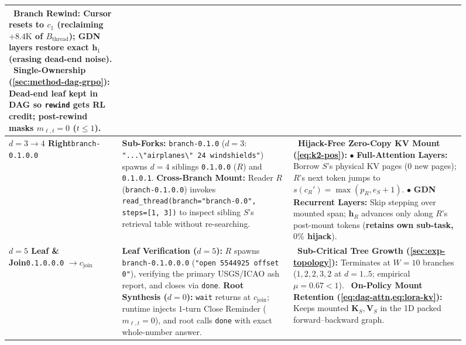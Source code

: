\documentclass{article}
\newcommand{\tstrut}{\rule{0pt}{3.55ex}}
\newcommand{\bstrut}{\rule[-2.15ex]{0pt}{0pt}}
\newcommand{\good}[1]{{\color{ourstext}\bfseries #1}}
\newcommand{\cmarkyes}{\textcolor{ourstext}{\ding{51}}}
\begin{document}
\begin{figure}[!t]
{\begin{tabular}{L{2.45cm} L{8.15cm} L{7.90cm}}
\tstrut\cmarkyes~\textbf{Branch Rewind:} Cursor resets to $c_1$ (reclaiming $+8.4\text{K}$ of $B_{\text{thread}}$); GDN layers restore exact $\mathbf{h}_1$ (erasing dead-end noise).\newline
\cmarkyes~\textbf{Single-Ownership (\cref{sec:method-dag-grpo}):} Dead-end leaf kept in DAG so \texttt{rewind} gets RL credit; post-rewind masks $m_{\ell,t}=0$ ($t \le 1$).\bstrut \\
\midrule
{}
\tstrut\textbf{$d=3 \to 4$ Right}\newline\texttt{branch-0.1.0.0}\bstrut &
\tstrut\textbf{Sub-Forks:} \texttt{branch-0.1.0} ($d=3$: \texttt{"...\textbackslash"airplanes\textbackslash" 24 windshields"}) spawns $d=4$ siblings \texttt{0.1.0.0} ($R$) and \texttt{0.1.0.1}.\newline
\textbf{Cross-Branch Mount:} Reader $R$ (\texttt{branch-0.1.0.0}) invokes \texttt{read\_thread(branch="branch-0.0", steps=[1, 3])} to inspect sibling $S$'s retrieval table without re-searching.\bstrut &
\tstrut\good{\cmarkyes~Hijack-Free Zero-Copy KV Mount (\cref{eq:k2-pos}):}\newline
$\bullet$ \textbf{Full-Attention Layers:} Borrow $S$'s physical KV pages ($0$ new pages); $R$'s next token jumps to $s(c_R') = \max(p_R, e_S+1)$.\newline
$\bullet$ \textbf{GDN Recurrent Layers:} Skip stepping over mounted span; $\mathbf{h}_R$ advances only along $R$'s post-mount tokens (\textbf{retains own sub-task, $0\%$ hijack}).\bstrut \\
\midrule
{}
\tstrut\textbf{$d=5$ Leaf \& Join}\newline\texttt{0.1.0.0.0} $\to c_{\text{join}}$\bstrut &
\tstrut\textbf{Leaf Verification ($d=5$):} $R$ spawns \texttt{branch-0.1.0.0.0} (\texttt{"open 5544925 offset 0"}), verifying the primary USGS/ICAO ash report, and closes via \texttt{done}.\newline
\textbf{Root Synthesis ($d=0$):} \texttt{wait} returns at $c_{\text{join}}$; runtime injects $1$-turn Close Reminder ($m_{\ell,t}=0$), and root calls \texttt{done} with exact whole-number answer.\bstrut &
\tstrut\cmarkyes~\textbf{Sub-Critical Tree Growth (\cref{sec:exp-topology}):} Terminates at $W=10$ branches ($1,2,2,3,2$ at $d=1..5$; empirical $\mu = 0.67 < 1$).\newline
\cmarkyes~\textbf{On-Policy Mount Retention (\cref{eq:dag-attn,eq:lora-kv}):} Keeps mounted $\mathbf{K}_S, \mathbf{V}_S$ in the 1D packed forward--backward graph.\bstrut \\
\bottomrule
\end{tabular}%
}
\end{figure}
\FloatBarrier
\end{document}
